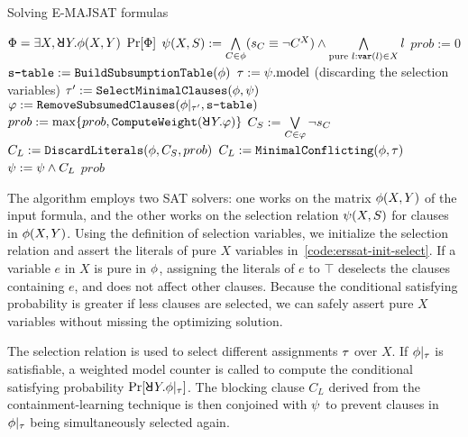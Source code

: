 \begin{algorithm}[p]
    \caption{Solving E-MAJSAT formulas}
    \label{alg:erssat}
    \begin{algorithmic}[1]
        \REQUIRE $\Qf=\exists X,\random{} Y.\pf(X,Y)$
        \ENSURE $\Pr[\Phi]$
        \STATE $\psi(X,S) := \bigwedge\limits_{C\in\phi}(s_{C}\equiv\lnot C^X)\land\bigwedge\limits_{\text{pure }l: \texttt{var}(l)\in X}l$\label{code:erssat-init-select}
        \STATE $prob := 0$
        \STATE $\texttt{s-table} := \texttt{BuildSubsumptionTable}(\phi)$\label{code:erssat-subsume-table}
        \WHILE{($\sat{\select}$)}
        \STATE $\tau := \psi.\mathrm{model}$ (discarding the selection variables)
        \IF{($\sat{\pcf{\pf}{\as}}$)}
        \STATE $\tau' := \texttt{SelectMinimalClauses}(\phi,\psi)$\label{code:erssat-minimal-clauses}
        \STATE $\varphi := \texttt{RemoveSubsumedClauses}(\phi|_{\tau'},\texttt{s-table})$\label{code:erssat-subsume-clauses}
        \STATE $prob := \max\{prob,\texttt{ComputeWeight}(\random{} Y.\varphi)\}$\label{code:erssat-wmc}
        \STATE $C_S := \bigvee\limits_{C\in\varphi}\lnot s_{C}$
        \STATE $C_L := \texttt{DiscardLiterals}(\phi,C_S,prob)$\label{code:erssat-discard-literals}
        \ELSE
        \STATE $C_L := \texttt{MinimalConflicting}(\phi,\tau)$
        \ENDIF
        \STATE $\psi := \psi \land C_L$
        \ENDWHILE
        \RETURN $prob$
    \end{algorithmic}
\end{algorithm}

The algorithm employs two SAT solvers:
one works on the matrix $\phi(X,Y)$ of the input formula,
and the other works on the selection relation $\psi(X,S)$ for clauses in $\phi(X,Y)$.
Using the definition of selection variables,
we initialize the selection relation and assert the literals of pure $X$ variables in~\cref{code:erssat-init-select}.
If a variable $e$ in $X$ is pure in $\phi$,
assigning the literals of $e$ to $\top$ deselects the clauses containing $e$,
and does not affect other clauses.
Because the conditional satisfying probability is greater if less clauses are selected,
we can safely assert pure $X$ variables without missing the optimizing solution.

The selection relation is used to select different assignments $\tau$ over $X$.
If $\phi|_{\tau}$ is satisfiable,
a weighted model counter is called to compute the conditional satisfying probability $\spb{\random{} Y.\pcf{\pf}{\as}}$.
The blocking clause $C_L$ derived from the containment-learning technique is then conjoined with $\psi$ to prevent clauses in $\phi|_{\tau}$ being simultaneously selected again.

